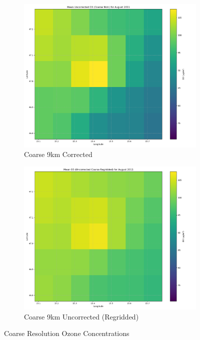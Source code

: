\documentclass[12pt,a4paper]{article}
\begin{document}
\begin{figure}[H]
    \centering
    \begin{subfigure}[b]{0.48\textwidth}
        \centering
        \includegraphics[width=\textwidth]{o3_mean_corrected_coarse_august_2011.png}
        \caption{Coarse 9km Corrected}
    \end{subfigure}
    \hfill
    \begin{subfigure}[b]{0.48\textwidth}
        \centering
        \includegraphics[width=\textwidth]{o3_mean_corrected_regridded_august_2011.png}
        \caption{Coarse 9km Uncorrected (Regridded)}
    \end{subfigure}
    \caption{Coarse Resolution Ozone Concentrations}
\end{figure}
\end{document}
